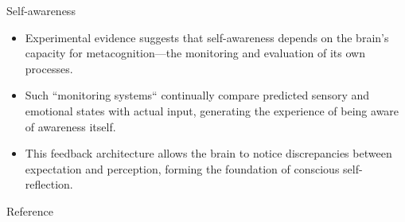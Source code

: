 \begin{frame}[allowframebreaks]{Self-awareness}
    \begin{itemize}
        \item Experimental evidence suggests that self-awareness depends on the brain's capacity for metacognition—the monitoring and evaluation of its own processes.
        \item Such ``monitoring systems`` continually compare predicted sensory and emotional states with actual input, generating the experience of being aware of awareness itself.
        \item This feedback architecture allows the brain to notice discrepancies between expectation and perception, forming the foundation of conscious self-reflection.
    \end{itemize}
    Reference \cite{garcia-2013-stuck-in-the-moment}
\end{frame}